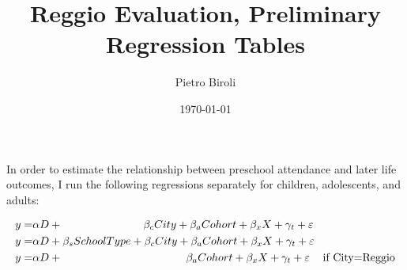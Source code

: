 \documentclass[12pt,english]{article}
\title{Reggio Evaluation, Preliminary Regression Tables}
\author{Pietro Biroli}
\date{\today}
\begin{document}
\maketitle

In order to estimate the relationship between preschool attendance and later life outcomes, I run the following regressions separately for children, adolescents, and adults:

\begin{align}
y = & \alpha D + \hspace{17ex}  \beta_c City + \beta_a Cohort + \beta_x X + \gamma_t + \varepsilon \\
y = & \alpha D + \beta_s SchoolType + \beta_c City + \beta_a Cohort + \beta_x X + \gamma_t + \varepsilon \\
y = & \alpha D + \hspace{26ex}  \beta_a Cohort + \beta_x X + \gamma_t + \varepsilon \hspace{2ex}  \text{ if City=Reggio}
\end{align}
\end{document}
